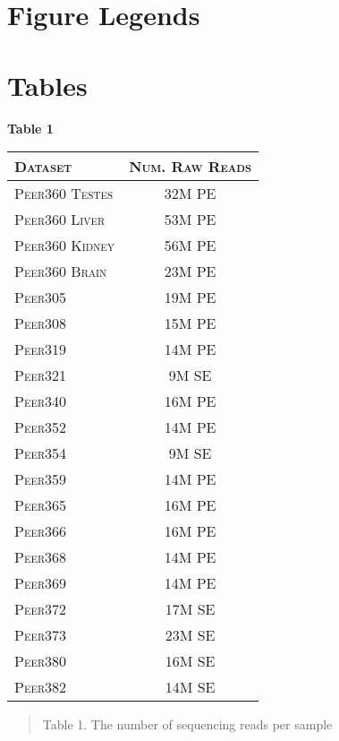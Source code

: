 \documentclass[11pt]{article}
\begin{document}
\section*{Figure Legends}


\section*{Tables}

\vspace{10mm}
\textbf{\hypertarget{Table 1}{Table 1}} \\
\begin{center}
\begin{tabular}{l|c }
\textsc{Dataset}& \textsc{Num. Raw Reads} \\
\hline 
\textsc{Peer360 Testes} & 32M PE  \\
\textsc{Peer360 Liver} & 53M PE   \\
\textsc{Peer360 Kidney} & 56M PE   \\
\textsc{Peer360 Brain}  & 23M PE \\
\textsc{Peer305}  & 19M PE  \\
\textsc{Peer308}  & 15M PE  \\
\textsc{Peer319}  & 14M PE  \\
\textsc{Peer321}  & 9M SE  \\
\textsc{Peer340}  & 16M PE  \\
\textsc{Peer352}  & 14M PE  \\
\textsc{Peer354}  & 9M SE  \\
\textsc{Peer359}  & 14M PE  \\
\textsc{Peer365}  & 16M PE \\
\textsc{Peer366}  & 16M PE  \\
\textsc{Peer368}  & 14M PE  \\
\textsc{Peer369}  & 14M PE  \\
\textsc{Peer372}  & 17M SE  \\
\textsc{Peer373}  & 23M SE  \\
\textsc{Peer380}  & 16M SE  \\
\textsc{Peer382}  & 14M SE  \\
\end{tabular}
\begin{quote}
\small{Table 1. The number of sequencing reads per sample}
\end{quote}


\end{center}  


\vspace{5mm}
\end{document}
